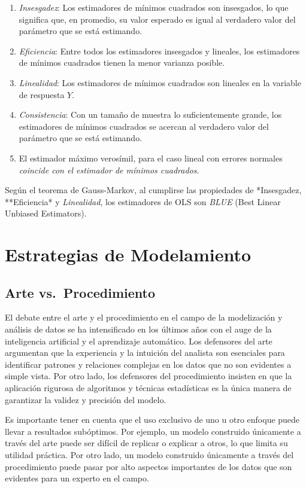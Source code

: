 \documentclass[
]{book}
\begin{document}
\begin{enumerate}
\def\labelenumi{\arabic{enumi}.}
\item
  \emph{Insesgadez}: Los estimadores de mínimos cuadrados son insesgados,
  lo que significa que, en promedio, su valor esperado es igual al
  verdadero valor del parámetro que se está estimando.
\item
  \emph{Eficiencia}: Entre todos los estimadores insesgados y lineales, los
  estimadores de mínimos cuadrados tienen la menor varianza posible.
\item
  \emph{Linealidad}: Los estimadores de mínimos cuadrados son lineales en
  la variable de respuesta \(Y\).
\item
  \emph{Consistencia}: Con un tamaño de muestra lo suficientemente grande,
  los estimadores de mínimos cuadrados se acercan al verdadero valor
  del parámetro que se está estimando.
\item
  El estimador máximo verosímil, para el caso lineal con errores
  normales \emph{coincide con el estimador de mínimos cuadrados}.
\end{enumerate}

Según el teorema de Gauss-Markov, al cumplirse las propiedades de
*Insesgadez, **Eficiencia* y \emph{Linealidad}, los estimadores de OLS
son \emph{BLUE} (Best Linear Unbiased Estimators).

\section{Estrategias de Modelamiento}\label{estrategias-de-modelamiento-1}

\subsection{Arte vs.~Procedimiento}\label{arte-vs.-procedimiento-1}

El debate entre el arte y el procedimiento en el campo de la
modelización y análisis de datos se ha intensificado en los últimos años
con el auge de la inteligencia artificial y el aprendizaje automático.
Los defensores del arte argumentan que la experiencia y la intuición del
analista son esenciales para identificar patrones y relaciones complejas
en los datos que no son evidentes a simple vista. Por otro lado, los
defensores del procedimiento insisten en que la aplicación rigurosa de
algoritmos y técnicas estadísticas es la única manera de garantizar la
validez y precisión del modelo.

Es importante tener en cuenta que el uso exclusivo de uno u otro enfoque
puede llevar a resultados subóptimos. Por ejemplo, un modelo construido
únicamente a través del arte puede ser difícil de replicar o explicar a
otros, lo que limita su utilidad práctica. Por otro lado, un modelo
construido únicamente a través del procedimiento puede pasar por alto
aspectos importantes de los datos que son evidentes para un experto en
el campo.
\end{document}
